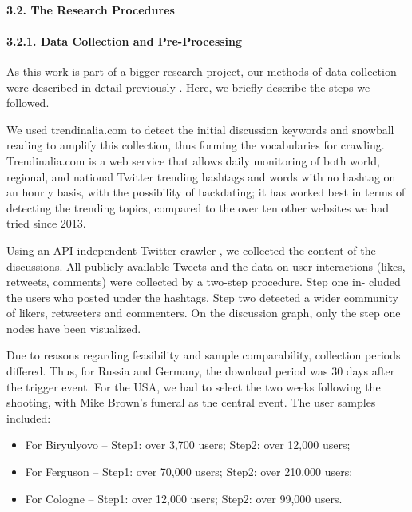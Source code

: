 \paragraph{3.2. The Research Procedures}

\paragraph{3.2.1. Data Collection and Pre-Processing}

As this work is part of a bigger research project, our methods of data collection were described in detail previously \cite{BodrunovaLitvinenkoBlekanov2017}. Here, we briefly describe the steps we followed.

We used trendinalia.com to detect the initial discussion keywords and snowball reading to amplify this collection, thus forming the vocabularies for crawling. Trendinalia.com is a web service that allows daily monitoring of both world, regional, and national Twitter trending hashtags and words with no hashtag on an hourly basis, with the possibility of backdating; it has worked best in terms of detecting the trending topics, compared to the over ten other websites we had tried since 2013.

Using an API-independent Twitter crawler \cite{BlekanovSergeevMartynenko}, we collected the content of the discussions. All publicly available Tweets and the data on user interactions (likes, retweets, comments) were collected by a two-step procedure. Step one in- cluded the users who posted under the hashtags. Step two detected a wider community of likers, retweeters and commenters. On the discussion graph, only the step one nodes have been visualized.

Due to reasons regarding feasibility and sample comparability, collection periods differed. Thus, for Russia and Germany, the download period was 30 days after the trigger event. For the USA, we had to select the two weeks following the shooting, with Mike Brown’s funeral as the central event. The user samples included:

\begin{itemize}
	\item For Biryulyovo -- Step1: over 3,700 users; Step2: over 12,000 users;
	\item For Ferguson -- Step1: over 70,000 users; Step2: over 210,000 users;
	\item For Cologne -- Step1: over 12,000 users; Step2: over 99,000 users.
\end{itemize}

